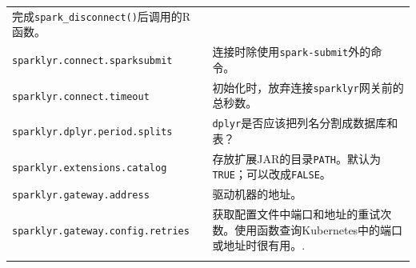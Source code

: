 \documentclass[
]{article}
\begin{document}
\begin{longtable}[]{@{}ll@{}}
\begin{minipage}[t]{0.47\columnwidth}
完成\texttt{spark\_disconnect()}后调用的R函数。\strut
\end{minipage}\tabularnewline
\begin{minipage}[t]{0.47\columnwidth}\raggedright
\texttt{sparklyr.connect.sparksubmit}\strut
\end{minipage} & \begin{minipage}[t]{0.47\columnwidth}\raggedright
连接时除使用\texttt{spark-submit}外的命令。\strut
\end{minipage}\tabularnewline
\begin{minipage}[t]{0.47\columnwidth}\raggedright
\texttt{sparklyr.connect.timeout}\strut
\end{minipage} & \begin{minipage}[t]{0.47\columnwidth}\raggedright
初始化时，放弃连接\texttt{sparklyr}网关前的总秒数。\strut
\end{minipage}\tabularnewline
\begin{minipage}[t]{0.47\columnwidth}\raggedright
\texttt{sparklyr.dplyr.period.splits}\strut
\end{minipage} & \begin{minipage}[t]{0.47\columnwidth}\raggedright
\texttt{dplyr}是否应该把列名分割成数据库和表？\strut
\end{minipage}\tabularnewline
\begin{minipage}[t]{0.47\columnwidth}\raggedright
\texttt{sparklyr.extensions.catalog}\strut
\end{minipage} & \begin{minipage}[t]{0.47\columnwidth}\raggedright
存放扩展JAR的目录\texttt{PATH}。默认为\texttt{TRUE}；可以改成\texttt{FALSE}。\strut
\end{minipage}\tabularnewline
\begin{minipage}[t]{0.47\columnwidth}\raggedright
\texttt{sparklyr.gateway.address}\strut
\end{minipage} & \begin{minipage}[t]{0.47\columnwidth}\raggedright
驱动机器的地址。\strut
\end{minipage}\tabularnewline
\begin{minipage}[t]{0.47\columnwidth}\raggedright
\texttt{sparklyr.gateway.config.retries}\strut
\end{minipage} & \begin{minipage}[t]{0.47\columnwidth}\raggedright
获取配置文件中端口和地址的重试次数。使用函数查询Kubernetes中的端口或地址时很有用。.\strut
\end{minipage}\tabularnewline
\begin{minipage}[t]{0.47\columnwidth}\raggedright

\end{minipage}
\end{longtable}
\end{document}
